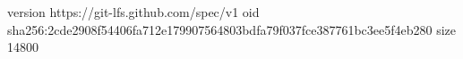 version https://git-lfs.github.com/spec/v1
oid sha256:2cde2908f54406fa712e179907564803bdfa79f037fce387761bc3ee5f4eb280
size 14800
